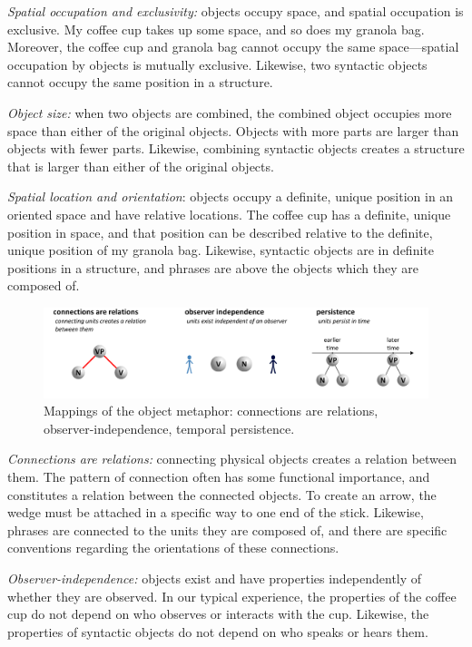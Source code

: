 \textit{Spatial occupation and exclusivity:} objects occupy space, and spatial occupation is exclusive. My coffee cup takes up some space, and so does my granola bag. Moreover, the coffee cup and granola bag cannot occupy the same space—spatial occupation by objects is mutually exclusive. Likewise, two syntactic objects cannot occupy the same position in a structure. 

\textit{Object size:} when two objects are combined, the combined object occupies more space than either of the original objects. Objects with more parts are larger than objects with fewer parts. Likewise, combining syntactic objects creates a structure that is larger than either of the original objects.

\textit{Spatial location and orientation}: objects occupy a definite, unique position in an oriented space and have relative locations. The coffee cup has a definite, unique position in space, and that position can be described relative to the definite, unique position of my granola bag. Likewise, syntactic objects are in definite positions in a structure, and phrases are above the objects which they are composed of.

  
\begin{figure}
\includegraphics[width=\textwidth]{figures/Tilsen-img31.png}
\caption{Mappings of the object metaphor: connections are relations, observer-independence, temporal persistence.}
\label{fig:3:3}
\end{figure}
 

\textit{Connections are relations:} connecting physical objects creates a relation between them. The pattern of connection often has some functional importance, and constitutes a relation between the connected objects. To create an arrow, the wedge must be attached in a specific way to one end of the stick. Likewise, phrases are connected to the units they are composed of, and there are specific conventions regarding the orientations of these connections.

\textit{Observer-independence:} objects exist and have properties independently of whether they are observed. In our typical experience, the properties of the coffee cup do not depend on who observes or interacts with the cup. Likewise, the properties of syntactic objects do not depend on who speaks or hears them.

